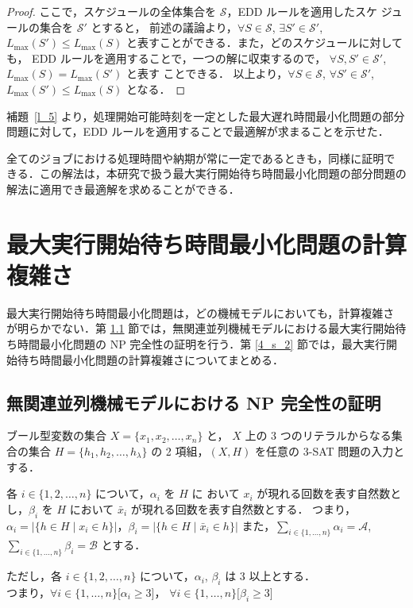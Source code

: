\documentclass[12pt]{optlab-bachelor}
\begin{document}
\begin{proof}
  ここで，スケジュールの全体集合を $\mathcal{S}$，EDD ルールを適用したスケ
  ジュールの集合を $\mathcal{S}'$ とすると，
  前述の議論より，$\forall S \in \mathcal{S}$, $\exists S' \in \mathcal{S}'$, $L_{\max}(S') \le L_{\max}(S)$ と表すことができる．また，どのスケジュールに対しても，
  EDD ルールを適用することで，一つの解に収束するので，
  $\forall S, S' \in \mathcal{S}'$, $L_{\max}(S) = L_{\max}(S')$ と表す
  ことできる．
  以上より，$\forall S \in \mathcal{S}$, $\forall
  S' \in \mathcal{S}'$, $L_{\max}(S') \le L_{\max}(S)$ となる．
\end{proof}

補題~\ref{l_5} より，処理開始可能時刻を一定とした最大遅れ時間最小化問題の部分問題に対して，EDD ルールを適用することで最適解が求まることを示せた．

全てのジョブにおける処理時間や納期が常に一定であるときも，同様に証明で
きる．この解法は，本研究で扱う最大実行開始待ち時間最小化問題の部分問題の解法に適用でき最適解を求めることができる．

\chapter{最大実行開始待ち時間最小化問題の計算複雑さ}\label{c_4}
最大実行開始待ち時間最小化問題は，どの機械モデルにおいても，計算複雑さ
が明らかでない．第 \ref{4_s_1} 節では，無関連並列機械モデルにおける最大実行開始待ち時間最小化問題の NP 完全性の証明を行う．第 \ref{4_s_2} 節では，最大実行開始待ち時間最小化問題の計算複雑さについてまとめる．

\section{無関連並列機械モデルにおける NP 完全性の証明}\label{4_s_1}

ブール型変数の集合 $X =\{x_1, x_2,\ldots ,x_n\}$ と， $X$ 上の 3 つのリテラルからなる集合の集合 $H =\{h_1, h_2,\ldots ,h_{\lambda}\}$ の 2 項組，$(X,H)$ を任意の \textsc{3-SAT} 問題の入力とする．

各 $i \in \{1,2,\ldots, n\}$ について，$\alpha_i$ を $H$ に おいて $x_i$ が現れる回数を表す自然数とし，$\beta_i$ を $H$ において $\bar x_i$ が現れる回数を表す自然数とする．
つまり，$\alpha_i = \big|\{h \in H \mid x_i \in h\}\big|$，$\beta_i = \big|\{h \in H \mid \bar x_i \in h\}\big|$
また，$\displaystyle \sum_{i \in \{1,\ldots,n\}} \alpha_i = \mathcal{A}$, $\displaystyle \sum_{i \in \{1,\ldots,n\}} \beta_i = \mathcal{B}$  とする．

ただし，各 $i \in \{1,2,\ldots, n\}$ について，$\alpha_i$, $\beta_i$ は 3 以上とする．\\
つまり，$\forall i \in \{1,\ldots,n\}\big[\alpha_i \ge 3\big]$，
$\forall i \in \{1,\ldots,n\}\big[\beta_i \ge 3\big]$
\end{document}

